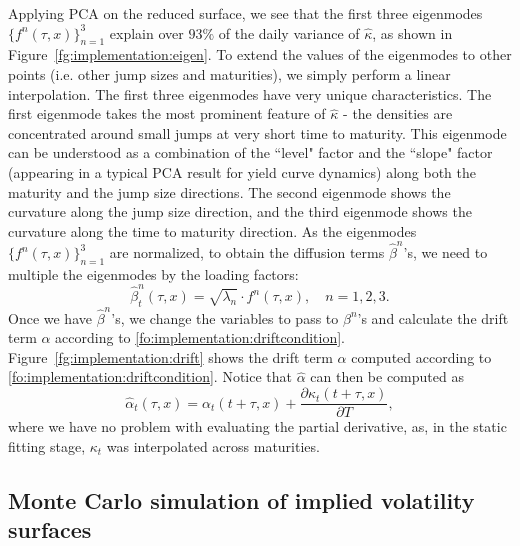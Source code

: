 \documentclass{article}
\numberwithin{equation}{section}
\def\halpha{\hat{\alpha}}
\def\hbeta{\hat{\beta}}
\def\hkappa{\hat{\kappa}}
\begin{document}
Applying PCA on the reduced surface, we see that the first three eigenmodes $\{f^n(\tau,x)\}_{n=1}^3$ explain over $93\%$ of the daily variance of $\hkappa$, as shown in Figure~\ref{fg:implementation:eigen}. To extend the values of the eigenmodes to other points (i.e. other jump sizes and maturities), we simply perform a linear interpolation.
The first three eigenmodes have very unique characteristics. The first eigenmode takes the most prominent feature of $\hkappa$ - the densities are concentrated around small jumps at very short time to maturity. This eigenmode can be understood as a combination of the ``level" factor and the ``slope" factor (appearing in a typical PCA result for yield curve dynamics) along both the maturity and the jump size directions. 
The second eigenmode shows the curvature along the jump size direction, and the third eigenmode shows the curvature along the time to maturity direction. 
As the eigenmodes $\{f^n(\tau,x)\}_{n=1}^3$ are normalized, to obtain the diffusion terms $\hbeta^n$'s, we need to multiple the eigenmodes by the loading factors:
\begin{equation}
\hbeta^n_t(\tau,x) = \sqrt{\lambda_n} \cdot f^n(\tau,x), \quad n = 1,2,3.
\end{equation}
Once we have $\hbeta^n$'s, we change the variables to pass to $\beta^n$'s and calculate the drift term $\alpha$ according to \eqref{fo:implementation:driftcondition}. Figure~\ref{fg:implementation:drift} shows the drift term $\alpha$ computed according to \eqref{fo:implementation:driftcondition}. 
Notice that $\halpha$ can then be computed as
\begin{equation}
\halpha_t(\tau,x) = \alpha_t(t+\tau,x) + \frac{\partial \kappa_t(t+\tau, x)}{\partial T},
\end{equation}
where we have no problem with evaluating the partial derivative, as, in the static fitting stage, $\kappa_t$ was interpolated across maturities.








 \subsection{Monte Carlo simulation of implied volatility surfaces}
\label{sec:implementation:simulation}
\end{document}
